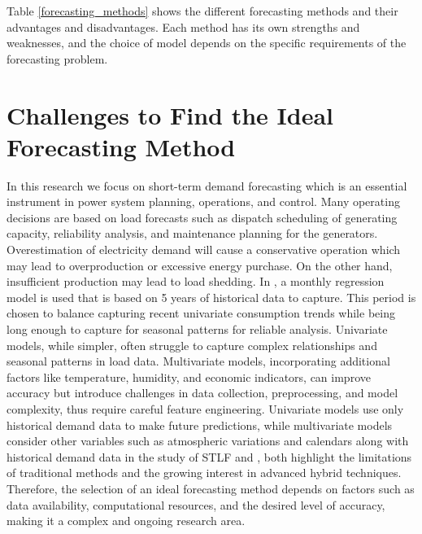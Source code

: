 \documentclass[mstat,12pt]{unswthesis}
\begin{document}
Table \ref{forecasting_methods} shows the different forecasting methods
and their advantages and disadvantages. Each method has its own
strengths and weaknesses, and the choice of model depends on the
specific requirements of the forecasting problem.

\bigskip

\section{Challenges to Find the Ideal Forecasting
Method}\label{challenges-to-find-the-ideal-forecasting-method}

In this research we focus on short-term demand forecasting which is an
essential instrument in power system planning, operations, and control.
Many operating decisions are based on load forecasts such as dispatch
scheduling of generating capacity, reliability analysis, and maintenance
planning for the generators. Overestimation of electricity demand will
cause a conservative operation which may lead to overproduction or
excessive energy purchase. On the other hand, insufficient production
may lead to load shedding. In \cite{AEMO}, a monthly regression model is
used that is based on 5 years of historical data to capture. This period
is chosen to balance capturing recent univariate consumption trends
while being long enough to capture for seasonal patterns for reliable
analysis. Univariate models, while simpler, often struggle to capture
complex relationships and seasonal patterns in load data. Multivariate
models, incorporating additional factors like temperature, humidity, and
economic indicators, can improve accuracy but introduce challenges in
data collection, preprocessing, and model complexity, thus require
careful feature engineering. Univariate models use only historical
demand data to make future predictions, while multivariate models
consider other variables such as atmospheric variations and calendars
along with historical demand data in the study of STLF
\cite{wang2016review} and \cite{chen2015electricity}, both highlight the
limitations of traditional methods and the growing interest in advanced
hybrid techniques. Therefore, the selection of an ideal forecasting
method depends on factors such as data availability, computational
resources, and the desired level of accuracy, making it a complex and
ongoing research area.
\end{document}
